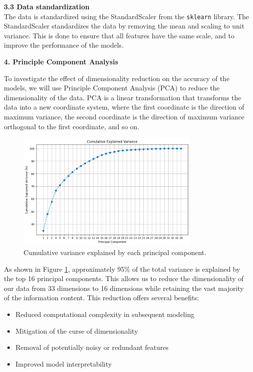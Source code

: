 \documentclass[12pt]{article}
\begin{document}
\textbf{3.3 Data standardization}
\\
The data is standardized using the StandardScaler from the \texttt{sklearn} library. The StandardScaler standardizes the data by removing the mean and scaling to unit variance. This is done to ensure that all features have the same scale, and to improve the performance of the models.

\vspace{20pt}

\textbf{4. Principle Component Analysis}

To investigate the effect of dimensionality reduction on the accuracy of the models, we will use Principle Component Analysis (PCA) to reduce the dimensionality of the data. PCA is a linear transformation that transforms the data into a new coordinate system, where the first coordinate is the direction of maximum variance, the second coordinate is the direction of maximum variance orthogonal to the first coordinate, and so on. 

\begin{figure}[h!]
\centering
\includegraphics[width=0.8\textwidth]{figures/cum_var_scree.png}
\caption{Cumulative variance explained by each principal component.}
\label{fig:scree_plot}
\end{figure}

As shown in Figure \ref{fig:scree_plot}, approximately 95\% of the total variance is explained by the top 16 principal components. This allows us to reduce the dimensionality of our data from 33 dimensions to 16 dimensions while retaining the vast majority of the information content. This reduction offers several benefits:

\begin{itemize}
    \item Reduced computational complexity in subsequent modeling
    \item Mitigation of the curse of dimensionality
    \item Removal of potentially noisy or redundant features
    \item Improved model interpretability
\end{itemize}
\end{document}

